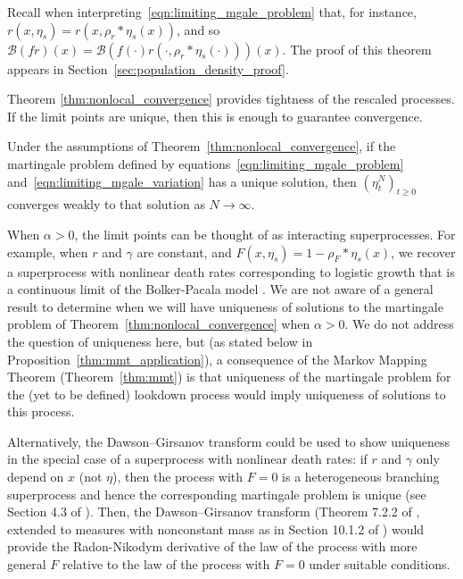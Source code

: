 \documentclass[EJP]{ejpecp} %
\newcommand{\DG}{\mathcal{B}}  %
\newcommand{\kernel}{\rho}  %
\newcommand{\smooth}[1]{\kernel_{#1} \! * \!}  %
\newcommand{\citep}[1]{\cite{#1}}
\begin{document}
Recall when interpreting~\eqref{eqn:limiting_mgale_problem}
that, for instance, $r(x, \eta_s) = r(x, \smooth{r} \eta_s(x))$,
and so $\DG(fr)(x) = \DG(f(\cdot) r(\cdot, \smooth{r} \eta_s(\cdot)))(x)$.
The proof of this theorem appears in Section~\ref{sec:population_density_proof}.

Theorem \ref{thm:nonlocal_convergence} provides tightness of the
rescaled processes. If the limit points are unique, then this
is enough to guarantee convergence.

\begin{corollary} \label{cor:superprocess_uniqueness}
    Under the assumptions of Theorem~\ref{thm:nonlocal_convergence},
    if the martingale problem
    defined by equations~\eqref{eqn:limiting_mgale_problem} 
and~\eqref{eqn:limiting_mgale_variation}
    has a unique solution,
    then $(\eta^N_t)_{t \ge 0}$ converges weakly
to that solution
    as $N \to \infty$.
\end{corollary}

When $\alpha>0$, the limit points can be thought of as interacting superprocesses. For
example, when $r$ and $\gamma$ are constant, and 
$F(x,\eta_s)=1-\smooth{F} \eta_s(x)$,
we recover a superprocess with nonlinear death rates corresponding to logistic growth
\citep{etheridge:2004}
that is a continuous limit of the Bolker-Pacala model \citep{bolker/pacala:1997,bolker/pacala:1999}.
We are not aware of a general result to determine when we will have uniqueness of 
solutions to the martingale problem of Theorem~\ref{thm:nonlocal_convergence} when $\alpha>0$.
We do not address the question of uniqueness here,
but (as stated below in Proposition~\ref{thm:mmt_application}),
a consequence of the Markov Mapping Theorem (Theorem~\ref{thm:mmt}) is that 
uniqueness of the martingale problem for the (yet to be defined) lookdown process would imply
uniqueness of solutions to this process.

Alternatively, the Dawson--Girsanov transform could be used to show uniqueness 
in the special case of a superprocess with nonlinear death rates:
if $r$ and $\gamma$ only depend on $x$ (not $\eta$),
then the process with $F=0$ is a heterogeneous branching superprocess
and hence the corresponding martingale problem is unique (see Section 4.3 of \cite{dawson:1993}).
Then, the Dawson--Girsanov transform (Theorem 7.2.2 of \cite{dawson:1993},
extended to measures with nonconstant mass as in Section 10.1.2 of \cite{dawson:1993})
would provide the Radon-Nikodym derivative of the law of the process with more general $F$
relative to the law of the process with $F=0$
under suitable conditions.
\end{document}
